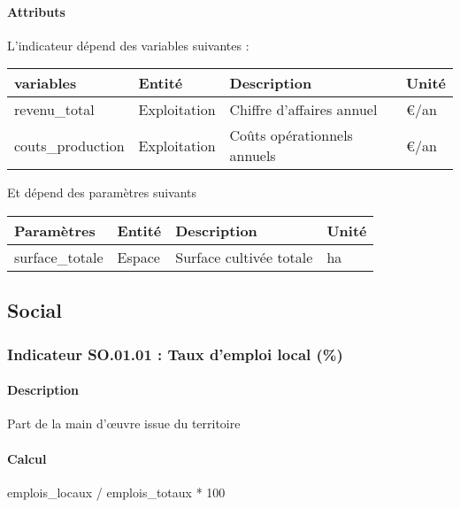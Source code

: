 \documentclass[
]{article}
\newenvironment{Shaded}{\begin{snugshade}}{\end{snugshade}}
\newcommand{\NormalTok}[1]{#1}
\begin{document}
\paragraph{Attributs}\label{attributs-37}

L'indicateur dépend des variables suivantes :

\begin{longtable}[]{@{}llll@{}}
\toprule\noalign{}
\textbf{variables} & \textbf{Entité} & \textbf{Description} &
\textbf{Unité} \\
\midrule\noalign{}
\endhead
\bottomrule\noalign{}
\endlastfoot
revenu\_total & Exploitation & Chiffre d'affaires annuel & €/an \\
couts\_production & Exploitation & Coûts opérationnels annuels & €/an \\
\end{longtable}

Et dépend des paramètres suivants

\begin{longtable}[]{@{}llll@{}}
\toprule\noalign{}
\textbf{Paramètres} & \textbf{Entité} & \textbf{Description} &
\textbf{Unité} \\
\midrule\noalign{}
\endhead
\bottomrule\noalign{}
\endlastfoot
surface\_totale & Espace & Surface cultivée totale & ha \\
\end{longtable}

\subsection{Social}\label{social}

\subsubsection{Indicateur SO.01.01 : Taux d'emploi local
(\%)}\label{indicateur-so.01.01-taux-demploi-local}

\paragraph{Description}\label{description-20}

Part de la main d'œuvre issue du territoire

\paragraph{Calcul}\label{calcul-20}

\begin{Shaded}
\begin{Highlighting}[]
\NormalTok{emplois\_locaux / emplois\_totaux * 100}
\end{Highlighting}
\end{Shaded}
\end{document}
